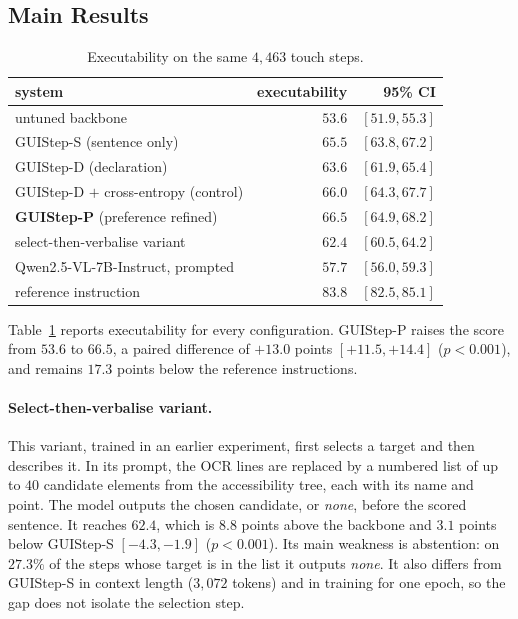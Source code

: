 \documentclass[runningheads,a4paper]{llncs}
\begin{document}
\subsection{Main Results}

\begin{table}[t]
\centering
\caption{Executability on the same $4{,}463$ touch steps.}
\label{tab:main}
\begin{tabular}{lrr}
\toprule
system & executability & 95\% CI\\
\midrule
untuned backbone & $53.6$ & $[51.9,55.3]$\\
\mbox{GUIStep-S} (sentence only) & $65.5$ & $[63.8,67.2]$\\
\mbox{GUIStep-D} (declaration) & $63.6$ & $[61.9,65.4]$\\
\mbox{GUIStep-D} $+$ cross-entropy (control) & $66.0$ & $[64.3,67.7]$\\
\textbf{GUIStep-P} (preference refined) & $\mathbf{66.5}$ & $[64.9,68.2]$\\
\midrule
select-then-verbalise variant & $62.4$ & $[60.5,64.2]$\\
Qwen2.5-VL-7B-Instruct, prompted & $57.7$ & $[56.0,59.3]$\\
\midrule
reference instruction & $83.8$ & $[82.5,85.1]$\\
\bottomrule
\end{tabular}
\end{table}

Table~\ref{tab:main} reports executability for every configuration. \mbox{GUIStep-P} raises the score
from $53.6$ to $66.5$, a paired difference of $+13.0$ points $[+11.5,+14.4]$ ($p<0.001$), and
remains $17.3$ points below the reference instructions.

\paragraph{Select-then-verbalise variant.}
This variant, trained in an earlier experiment, first selects a target and then describes it. In its prompt, the OCR lines are replaced by a numbered list of up to $40$ candidate elements from the accessibility tree, each with its name and point. The model outputs the chosen candidate, or \emph{none}, before the scored sentence. It reaches $62.4$, which is $8.8$ points above the backbone and $3.1$ points below
\mbox{GUIStep-S} $[-4.3,-1.9]$ ($p<0.001$). Its main weakness is abstention: on $27.3\%$ of the steps
whose target is in the list it outputs \emph{none}. It also differs from \mbox{GUIStep-S} in context length ($3{,}072$ tokens) and in training for one epoch, so the gap does not isolate the selection step.
\end{document}
